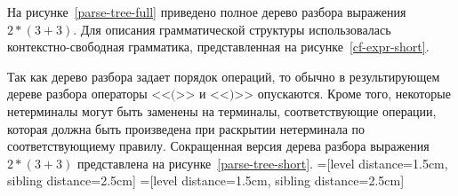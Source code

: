 На рисунке~\ref{parse-tree-full} приведено полное дерево разбора выражения $2 * (3 + 3)$.
Для описания грамматической структуры использовалась контекстно-свободная грамматика, представленная на рисунке~\ref{cf-expr-short}.

Так как дерево разбора задает порядок операций, то обычно в результирующем дереве разбора операторы <<$($>> и <<$)$>> опускаются.
Кроме того, некоторые нетерминалы могут быть заменены на терминалы, соответствующие операции, которая должна быть произведена при раскрытии нетерминала по соответствующиему правилу.
Сокращенная версия дерева разбора выражения $2 * (3 + 3)$ представлена на рисунке~\ref{parse-tree-short}.
=[level distance=1.5cm, sibling distance=2.5cm]
=[level distance=1.5cm, sibling distance=2.5cm]

